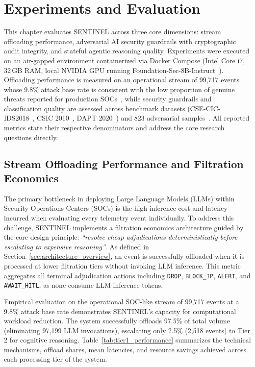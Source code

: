 \chapter{Experiments and Evaluation}
\label{ch:experiments_evaluation}

This chapter evaluates SENTINEL across three core dimensions: stream offloading performance, adversarial AI security guardrails with cryptographic audit integrity, and stateful agentic reasoning quality. Experiments were executed on an air-gapped environment containerized via Docker Compose (Intel Core i7, 32\,GB RAM, local NVIDIA GPU running Foundation-Sec-8B-Instruct~\cite{foundation_sec_instruct}). Offloading performance is measured on an operational stream of 99,717 events whose 9.8\% attack base rate is consistent with the low proportion of genuine threats reported for production SOCs~\cite{alahmadi2022}, while security guardrails and classification quality are assessed across benchmark datasets (CSE-CIC-IDS2018~\cite{ids2018}, CSIC 2010~\cite{csic2010}, DAPT 2020~\cite{dapt2020}) and 823 adversarial samples~\cite{advbench2023, deepset2023, jackhhao2023, shen2024dan}. All reported metrics state their respective denominators and address the core research questions directly.

\section{Stream Offloading Performance and Filtration Economics}
\label{sec:tier1_performance}

The primary bottleneck in deploying Large Language Models (LLMs) within Security Operations Centers (SOCs) is the high inference cost and latency incurred when evaluating every telemetry event individually. To address this challenge, SENTINEL implements a filtration economics architecture guided by the core design principle: \textit{``resolve cheap adjudications deterministically before escalating to expensive reasoning''}. As defined in Section~\ref{sec:architecture_overview}, an event is successfully offloaded when it is processed at lower filtration tiers without invoking LLM inference. This metric aggregates all terminal adjudication actions including \texttt{DROP}, \texttt{BLOCK\_IP}, \texttt{ALERT}, and \texttt{AWAIT\_HITL}, as none consume LLM inference tokens.

Empirical evaluation on the operational SOC-like stream of 99,717 events at a 9.8\% attack base rate demonstrates SENTINEL's capacity for computational workload reduction. The system successfully offloads 97.5\% of total volume (eliminating 97,199 LLM invocations), escalating only 2.5\% (2,518 events) to Tier 2 for cognitive reasoning. Table~\ref{tab:tier1_performance} summarizes the technical mechanisms, offload shares, mean latencies, and resource savings achieved across each processing tier of the system.

